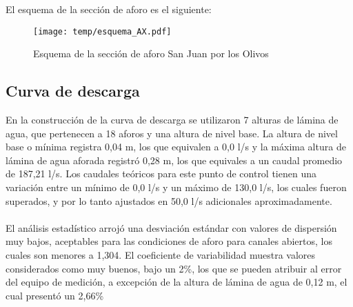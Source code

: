 \documentclass[]{article}
\begin{document}
El esquema de la sección de aforo es el siguiente:

\begin{figure}[H]
  \centering
  \texttt{[image: temp/esquema\_AX.pdf]}
\caption{Esquema de la sección de aforo San Juan por los Olivos}
\label{fig:Esquema_AX}
\end{figure}

\subsection{Curva de descarga}\label{curva-de-descarga-23}

En la construcción de la curva de descarga se utilizaron 7 alturas de lámina de agua, que pertenecen a 18 aforos y una altura de nivel base. La altura de nivel base o mínima registra 0,04 m, los que equivalen a 0,0 l/s y la máxima altura de lámina de agua aforada registró 0,28 m, los que equivales a un caudal promedio de 187,21 l/s. Los caudales teóricos para este punto de control tienen una variación entre un mínimo de 0,0 l/s y un máximo de 130,0 l/s, los cuales fueron superados, y por lo tanto ajustados en 50,0 l/s adicionales aproximadamente.\\
\\
El análisis estadístico arrojó una desviación estándar con valores de dispersión muy bajos, aceptables para las condiciones de aforo para canales abiertos, los cuales son menores a 1,304. El coeficiente de variabilidad muestra valores considerados como muy buenos, bajo un 2\%, los que se pueden atribuir al error del equipo de medición, a excepción de la altura de lámina de agua de 0,12 m, el cual presentó un 2,66\%
\end{document}

